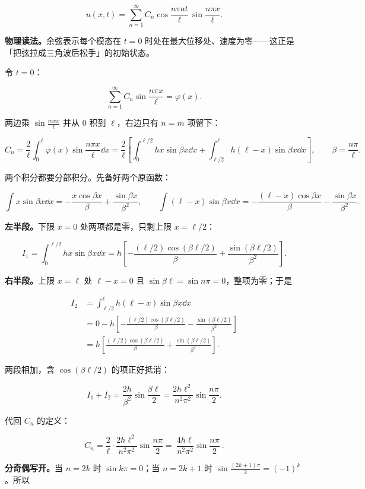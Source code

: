 \documentclass[11pt]{ctexart}
\begin{document}
\[
u(x,t)=\sum_{n=1}^{\infty}C_n\cos\frac{n\pi at}{\ell}\,\sin\frac{n\pi x}{\ell}.
\]

\textbf{物理读法。}余弦表示每个模态在 $t=0$ 时处在最大位移处、速度为零——这正是「把弦拉成三角波后松手」的初始状态。


令 $t=0$：

\[
\sum_{n=1}^{\infty}C_n\sin\frac{n\pi x}{\ell}=\varphi(x).
\]

两边乘 $\sin\frac{m\pi x}{\ell}$ 并从 $0$ 积到 $\ell$，右边只有 $n=m$ 项留下：

\[
C_n=\frac{2}{\ell}\int_0^{\ell}\varphi(x)\sin\frac{n\pi x}{\ell}\dd x
=\frac{2}{\ell}\left[\int_0^{\ell/2}hx\sin\beta x\dd x+\int_{\ell/2}^{\ell}h(\ell-x)\sin\beta x\dd x\right],
\qquad \beta=\frac{n\pi}{\ell}.
\]

两个积分都要分部积分。先备好两个原函数：

\[
\int x\sin\beta x\dd x=-\frac{x\cos\beta x}{\beta}+\frac{\sin\beta x}{\beta^2},
\qquad
\int(\ell-x)\sin\beta x\dd x=-\frac{(\ell-x)\cos\beta x}{\beta}-\frac{\sin\beta x}{\beta^2}.
\]

\textbf{左半段。}下限 $x=0$ 处两项都是零，只剩上限 $x=\ell/2$：

\[
I_1=\int_0^{\ell/2}hx\sin\beta x\dd x
=h\left[-\frac{(\ell/2)\cos(\beta\ell/2)}{\beta}+\frac{\sin(\beta\ell/2)}{\beta^2}\right].
\]

\textbf{右半段。}上限 $x=\ell$ 处 $\ell-x=0$ 且 $\sin\beta\ell=\sin n\pi=0$，整项为零；于是

\[
\begin{aligned}
I_2&=\int_{\ell/2}^{\ell}h(\ell-x)\sin\beta x\dd x\\
&=0-h\left[-\frac{(\ell/2)\cos(\beta\ell/2)}{\beta}-\frac{\sin(\beta\ell/2)}{\beta^2}\right]\\
&=h\left[\frac{(\ell/2)\cos(\beta\ell/2)}{\beta}+\frac{\sin(\beta\ell/2)}{\beta^2}\right].
\end{aligned}
\]

两段相加，含 $\cos(\beta\ell/2)$ 的项正好抵消：

\[
I_1+I_2=\frac{2h}{\beta^2}\sin\frac{\beta\ell}{2}
=\frac{2h\ell^2}{n^2\pi^2}\sin\frac{n\pi}{2}.
\]

代回 $C_n$ 的定义：

\[
C_n=\frac{2}{\ell}\cdot\frac{2h\ell^2}{n^2\pi^2}\sin\frac{n\pi}{2}
=\boxed{\ \frac{4h\ell}{n^2\pi^2}\sin\frac{n\pi}{2}\ }.
\]

\textbf{分奇偶写开。}当 $n=2k$ 时 $\sin k\pi=0$；当 $n=2k+1$ 时 $\sin\frac{(2k+1)\pi}{2}=(-1)^k$。所以
\end{document}
